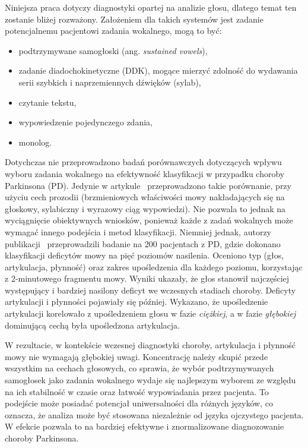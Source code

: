 Niniejsza praca dotyczy diagnostyki opartej na analizie głosu, dlatego temat ten zostanie bliżej rozważony.
Założeniem dla takich systemów jest zadanie potencjalnemu pacjentowi zadania wokalnego, mogą to być:
\begin{itemize}[itemsep=0.1pt]
	\item podtrzymywane samogłoski (ang. \emph{sustained vowels}),
	\item zadanie diadochokinetyczne (DDK), mogące mierzyć zdolność do wydawania serii szybkich i naprzemiennych dźwięków (sylab),
	\item czytanie tekstu,
	\item wypowiedzenie pojedynczego zdania,
	\item monolog.
\end{itemize}

Dotychczas nie przeprowadzono badań porównawczych dotyczących wpływu wyboru zadania wokalnego na efektywność klasyfikacji w przypadku choroby Parkinsona (PD).
Jedynie w artykule~\cite{vocal_task_comparision} przeprowadzono takie porównanie, przy użyciu cech prozodii (brzmieniowych
właściwości mowy nakładających się na głoskowy, sylabiczny i wyrazowy ciąg wypowiedzi).
Nie pozwala to jednak na wyciągnięcie obiektywnych wniosków, ponieważ każde z zadań wokalnych może wymagać innego podejścia i metod klasyfikacji.
Niemniej jednak, autorzy publikacji~\cite{monitoring_speech} przeprowadzili badanie na 200 pacjentach z PD,
gdzie dokonano klasyfikacji deficytów mowy na pięć poziomów nasilenia.
Oceniono typ (głos, artykulacja, płynność) oraz zakres upośledzenia dla każdego poziomu, korzystając z 2-minutowego fragmentu mowy.
Wyniki ukazały, że głos stanowił najczęściej występujący i bardziej nasilony deficyt we wczesnych stadiach choroby.
Deficyty artykulacji i płynności pojawiały się później.
Wykazano, że upośledzenie artykulacji korelowało z upośledzeniem głosu w fazie \emph{ciężkiej}, a w fazie \emph{głębokiej} dominującą cechą była upośledzona artykulacja.

W rezultacie, w kontekście wczesnej diagnostyki choroby, artykulacja i płynność mowy nie wymagają głębokiej uwagi.
Koncentrację należy skupić przede wszystkim na cechach głosowych, co sprawia, że wybór podtrzymywanych samogłosek jako zadania wokalnego
wydaje się najlepszym wyborem ze względu na ich stabilność w czasie oraz łatwość wypowiadania przez pacjenta.
To podejście może posiadać potencjał uniwersalności dla różnych języków, co oznacza, że analiza może być stosowana
niezależnie od języka ojczystego pacjenta.
W efekcie pozwala to na bardziej efektywne i znormalizowane diagnozowanie choroby Parkinsona.

